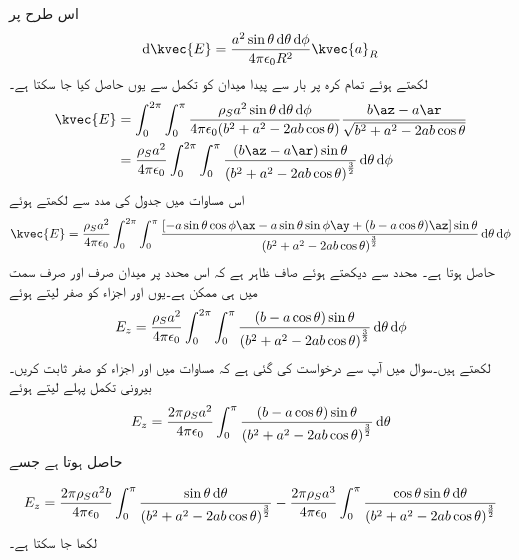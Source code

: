 اس طرح  پر
%
\begin{align*}
\dif \kvec{E}= \frac{a^2 \sin \theta \dif \theta \dif \phi}{4 \pi \epsilon_0 R^2} \kvec{a}_R
\end{align*} 
لکھتے ہوئے تمام کرہ پر بار سے پیدا میدان کو تکمل سے یوں حاصل کیا جا سکتا ہے۔
\begin{gather}
\begin{aligned}
\kvec{E}&=\int_{0}^{2\pi} \int_0^{\pi} \frac{\rho_S a^2 \sin \theta \dif \theta \dif \phi}{4 \pi \epsilon_0 (b^2+a^2-2 ab \cos \theta)} \frac{b\az-a\ar}{\sqrt{b^2+a^2-2 ab \cos \theta}}\\
&=\frac{\rho_S a^2}{4 \pi \epsilon_0}\int_{0}^{2\pi} \int_0^{\pi} \frac{ (b\az-a\ar)\sin \theta }{ \left(b^2+a^2-2 ab \cos \theta \right)^{\frac{3}{2}}} \dif \theta \dif \phi
\end{aligned}
\end{gather}
اس مساوات میں جدول  کی مدد سے  لکھتے ہوئے
\begin{align}\label{مساوات_کولمب_کرہ-سطحی_بار_کثافت_کا_میدان}
\kvec{E}=\frac{\rho_S a^2}{4 \pi \epsilon_0}\int_{0}^{2\pi} \int_0^{\pi} \frac{[-a \sin \theta \cos \phi \ax-a \sin \theta \sin \phi \ay+ (b-a \cos \theta)\az ]\sin \theta }{ \left(b^2+a^2-2 ab \cos \theta \right)^{\frac{3}{2}}} \dif \theta \dif \phi
\end{align}
حاصل ہوتا ہے۔ محدد سے دیکھتے ہوئے صاف ظاہر ہے کہ اس محدد پر میدان صرف اور صرف  سمت میں ہی ممکن ہے۔یوں  اور  اجزاء کو صفر لیتے ہوئے
\begin{align}
E_z=\frac{\rho_S a^2}{4 \pi \epsilon_0}\int_{0}^{2\pi} \int_0^{\pi} \frac{(b-a \cos \theta) \sin \theta }{ \left(b^2+a^2-2 ab \cos \theta \right)^{\frac{3}{2}}} \dif \theta \dif \phi
\end{align}
لکھتے ہیں۔سوال  میں آپ سے  درخواست کی گئی ہے کہ  مساوات  میں  اور  اجزاء کو صفر ثابت کریں۔بیرونی تکمل پہلے لیتے ہوئے
\begin{align}
E_z=\frac{2 \pi\rho_S a^2}{4 \pi \epsilon_0} \int_0^{\pi} \frac{(b-a \cos \theta) \sin \theta }{ \left(b^2+a^2-2 ab \cos \theta \right)^{\frac{3}{2}}} \dif \theta
\end{align}
حاصل ہوتا ہے جسے

\begin{align}\label{مساوات_کولمب_کرہ_بار_کا_میدان_الف}
E_z=\frac{2 \pi\rho_S a^2 b}{4 \pi \epsilon_0} \int_0^{\pi} \frac{ \sin \theta \dif \theta}{ \left(b^2+a^2-2 ab \cos \theta \right)^{\frac{3}{2}}}-\frac{2 \pi\rho_S a^3}{4 \pi \epsilon_0} \int_0^{\pi} \frac{\cos \theta \sin \theta \dif \theta}{ \left(b^2+a^2-2 ab \cos \theta \right)^{\frac{3}{2}}}
\end{align}
لکھا جا سکتا ہے۔

